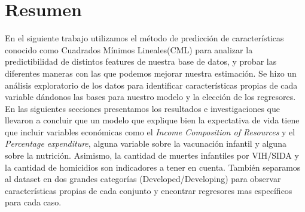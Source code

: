 \section{Resumen}
En el siguiente trabajo utilizamos el método de predicción de características conocido como Cuadrados Mínimos Lineales(CML) para analizar la predictibilidad de distintos features de nuestra base de datos, y probar las diferentes maneras con las que podemos mejorar nuestra estimación.
Se hizo un análisis exploratorio de los datos para identificar características propias de cada variable dándonos las bases para nuestro modelo y la elección de los regresores.
En las siguientes secciones presentamos los resultados e investigaciones que llevaron a concluir que un modelo que explique bien la expectativa de vida tiene que incluir variables económicas como el \textit{Income Composition of Resources} y el \textit{Percentage expenditure}, alguna variable sobre la vacunación infantil y alguna sobre la nutrición. Asimismo, la cantidad de muertes infantiles por VIH/SIDA y la cantidad de homicidios son indicadores a tener en cuenta.
También separamos al dataset en dos grandes categorías (Developed/Developing) para observar características propias de cada conjunto y encontrar regresores mas específicos para cada caso.
